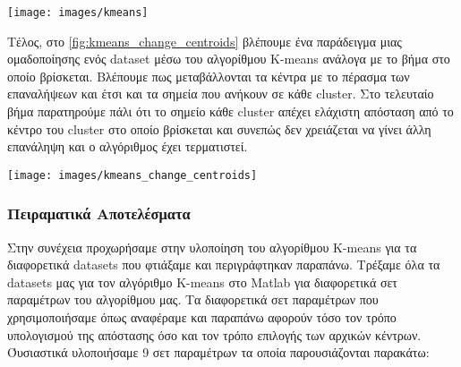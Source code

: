 \noindent\begin{minipage}{\linewidth}
    \centering
    \texttt{[image: images/kmeans]}
    \label{fig:kmeans}
\end{minipage}

Τέλος, 
στο \hyperref[fig:kmeans_change_centroids]{\figurename{} \ref{fig:kmeans_change_centroids}}
βλέπουμε ένα παράδειγμα μιας ομαδοποίησης ενός dataset μέσω του αλγορίθμου K-means ανάλογα με το βήμα στο οποίο βρίσκεται. Βλέπουμε πως μεταβάλλονται τα κέντρα με το πέρασμα των επαναλήψεων και έτσι και τα σημεία που ανήκουν σε κάθε cluster. Στο τελευταίο βήμα παρατηρούμε πάλι ότι το σημείο κάθε cluster απέχει ελάχιστη απόσταση από το κέντρο του cluster στο οποίο βρίσκεται και συνεπώς δεν χρειάζεται να γίνει άλλη επανάληψη και ο αλγόριθμος έχει τερματιστεί.

\noindent\begin{minipage}{\linewidth}
    \centering
    \texttt{[image: images/kmeans\_change\_centroids]}
    \label{fig:kmeans_change_centroids}
\end{minipage}

\subsubsection{Πειραματικά Αποτελέσματα}
Στην συνέχεια προχωρήσαμε στην υλοποίηση του αλγορίθμου K-means για τα διαφορετικά datasets που φτιάξαμε και περιγράφτηκαν παραπάνω. Τρέξαμε όλα τα datasets μας για τον αλγόριθμο K-means στο Matlab για διαφορετικά σετ παραμέτρων του αλγορίθμου μας. Τα διαφορετικά σετ παραμέτρων που χρησιμοποιήσαμε όπως αναφέραμε και παραπάνω αφορούν τόσο τον τρόπο υπολογισμού της απόστασης όσο και τον τρόπο επιλογής των αρχικών κέντρων. Όυσιαστικά υλοποιήσαμε 9 σετ παραμέτρων τα οποία παρουσιάζονται παρακάτω:

